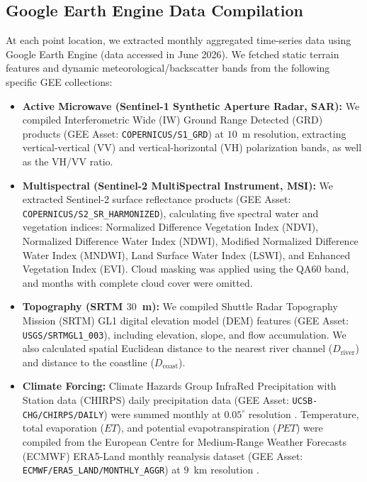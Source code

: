 \subsection{Google Earth Engine Data Compilation}
At each point location, we extracted monthly aggregated time-series data using Google Earth Engine \citep{Amani2020Google} (data accessed in June 2026). We fetched static terrain features and dynamic meteorological/backscatter bands from the following specific GEE collections:
\begin{itemize}
    \item \textbf{Active Microwave (Sentinel-1 Synthetic Aperture Radar, SAR):} We compiled Interferometric Wide (IW) Ground Range Detected (GRD) products (GEE Asset: \verb|COPERNICUS/S1_GRD|) at $10$~m resolution, extracting vertical-vertical (VV) and vertical-horizontal (VH) polarization bands, as well as the VH/VV ratio. 
    \item \textbf{Multispectral (Sentinel-2 MultiSpectral Instrument, MSI):} We extracted Sentinel-2 surface reflectance products (GEE Asset: \verb|COPERNICUS/S2_SR_HARMONIZED|), calculating five spectral water and vegetation indices: Normalized Difference Vegetation Index (NDVI), Normalized Difference Water Index (NDWI), Modified Normalized Difference Water Index (MNDWI), Land Surface Water Index (LSWI), and Enhanced Vegetation Index (EVI). Cloud masking was applied using the QA60 band, and months with complete cloud cover were omitted.
    \item \textbf{Topography (SRTM $30$~m):} We compiled Shuttle Radar Topography Mission (SRTM) GL1 digital elevation model (DEM) features (GEE Asset: \verb|USGS/SRTMGL1_003|), including elevation, slope, and flow accumulation. We also calculated spatial Euclidean distance to the nearest river channel ($D_{\text{river}}$) and distance to the coastline ($D_{\text{coast}}$).
    \item \textbf{Climate Forcing:} Climate Hazards Group InfraRed Precipitation with Station data (CHIRPS) daily precipitation data (GEE Asset: \verb|UCSB-CHG/CHIRPS/DAILY|) were summed monthly at $0.05^\circ$ resolution \citep{Funk2015The}. Temperature, total evaporation ($ET$), and potential evapotranspiration ($PET$) were compiled from the European Centre for Medium-Range Weather Forecasts (ECMWF) ERA5-Land monthly reanalysis dataset (GEE Asset: \verb|ECMWF/ERA5_LAND/MONTHLY_AGGR|) at $9$~km resolution \citep{MuñozSabater2021ERA5Land}.
\end{itemize}

